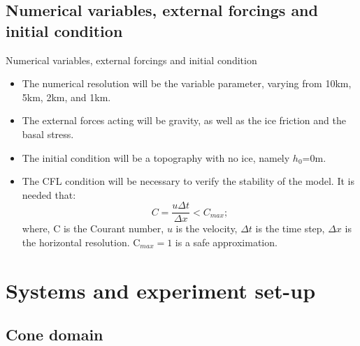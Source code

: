 \documentclass[11pt]{beamer}
\begin{document}
		\subsection{Numerical variables, external forcings and initial condition}
		\begin{frame}{Numerical variables, external forcings and initial condition}
			\begin{itemize}
				\item The numerical resolution will be the variable parameter, varying from 10km, 5km, 2km, and 1km.
				\item The external forces acting will be gravity, as well as the ice friction and the basal stress.
				\item The initial condition will be a topography with no ice, namely $h_0$=0m.
				\item The CFL condition will be necessary to verify the stability of the model. It is needed that:
				\begin{equation}
					C=\frac{u\Delta t}{\Delta x}<C_{max};
				\end{equation}
				where, C is the Courant number, $u$ is the velocity, $\Delta t$ is the time step, $\Delta x$ is the horizontal resolution. C$_{max}=1$ is a safe approximation.  
			\end{itemize}
		\end{frame}
	\section{Systems and experiment set-up}
	\subsection{Cone domain}
	
\end{document}
